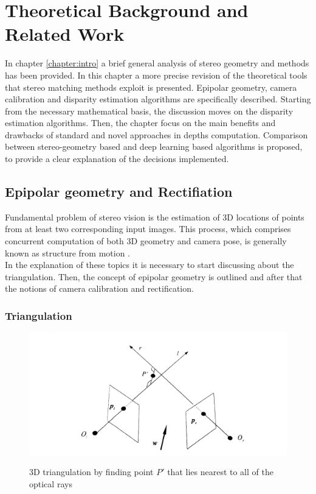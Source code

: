 \chapter{Theoretical Background and Related Work}
\label{chapter:background} 

In chapter \ref{chapter:intro} a brief general analysis of stereo geometry and methods has been provided. 
In this chapter a more precise revision of the theoretical tools that stereo matching methods exploit is presented.
Epipolar geometry, camera calibration and disparity estimation algorithms are specifically described. 
Starting from the necessary mathematical basis, the discussion moves on the disparity estimation algorithms. 
Then, the chapter focus on the main benefits and drawbacks of standard and novel approaches in depths computation.
Comparison between stereo-geometry based and deep learning based algorithms is proposed, to provide a clear explanation of the decisions implemented. 

\section{Epipolar geometry and Rectifiation}
\label{sec:eipolarandrect}

Fundamental problem of stereo vision is the estimation of 3D locations of points from at least two corresponding input images.
This process, which comprises concurrent computation of both 3D geometry and camera pose, is generally known as structure from motion \cite{Szeliski2011}.\\
In the explanation of these topics it is necessary to start discussing about the triangulation.
Then, the concept of epipolar geometry is outlined and after that the notions of camera calibration and rectification. 

\subsection{Triangulation}
\label{subsec:triangulation}

\begin{figure}[t]
	\begin{center}
		{\includegraphics[width=.8\textwidth]{images/triangulation}}
\caption{3D triangulation by finding point $P'$ that lies nearest to all of the optical rays}
\label{fig:triangulation}
	\end{center}
\end{figure}

